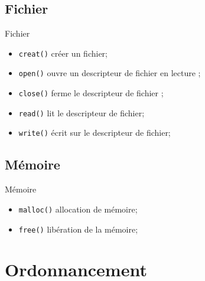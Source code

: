 \begin{frame}{\sectitle}
\def\subsectitle{Fichier}
\subsection{\subsectitle}

\begin{exampleblock}{\subsectitle}
\begin{itemize}
    \item \texttt{creat()} créer un fichier;
    \item \texttt{open()} ouvre un descripteur de fichier en lecture ;
    \item \texttt{close()} ferme le descripteur de fichier ;
    \item \texttt{read()} lit le descripteur de fichier;
    \item \texttt{write()} écrit sur le descripteur de fichier;
\end{itemize}
\end{exampleblock}

\def\subsectitle{Mémoire}
\subsection{\subsectitle}

\begin{exampleblock}{\subsectitle}
\begin{itemize}
    \item \texttt{malloc()} allocation de mémoire;
    \item \texttt{free()} libération de la mémoire;
\end{itemize}
\end{exampleblock}

\end{frame}

\def\sectitle{Ordonnancement}
\section{\sectitle}

